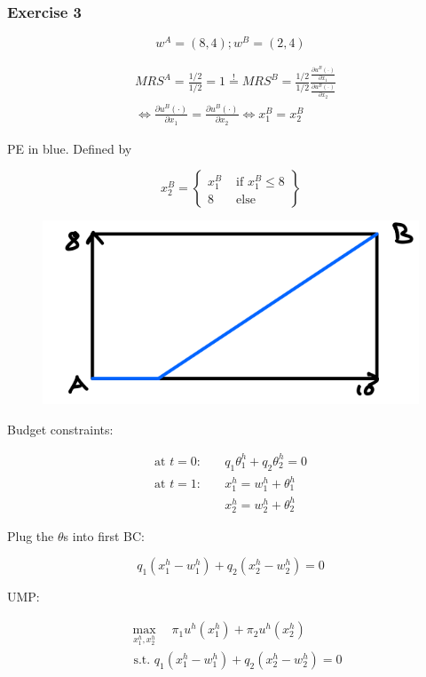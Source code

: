 {
\subsubsection*{Exercise 3} 

$$
w^{A}=(8,4) ; w^{B}=(2,4)
$$

\begin{enumerate}[label=(\alph*)]
{\item
$$
\begin{aligned}
& M R S^{A}=\frac{1 / 2}{1 / 2}=1 \stackrel{!}{=} MRS^{B}=\frac{1 / 2}{1 / 2} \frac{\frac{\partial u^{B}(\cdot)}{\partial x_{1}}}{\frac{\partial u^{B}(\cdot)}{\partial x_{2}}} \\
& \Longleftrightarrow \frac{\partial u^{B} \left(\cdot\right)}{\partial x_{1}}=\frac{\partial u^{B}(\cdot)}{\partial x_{2}} \Longleftrightarrow x_{1}^{B}=x_{2}^{B}
\end{aligned}
$$

PE in blue. Defined by

$$
x_{2}^{B}=\left\{\begin{array}{ll}
x_{1}^{B} & \text { if } x_{1}^{B} \leq 8 \\
8 & \text { else }
\end{array}\right\}
$$

\begin{figure}[!h]
    \centering
    \includegraphics[width=.5\textwidth]{images/2015_16_3.png}
\end{figure}
}
{\item 
Budget constraints:

\begin{align*}
    \text{at } t = 0: \quad & q_1 \theta_1^h+q_2 \theta_2^h=0 \\
    \text{at } t = 1: \quad & x_1^h=w_1^h+\theta_1^h \\
    & x_2^h=w_2^h+\theta_2^h
\end{align*}

Plug the $\theta$s into first BC:

$$
q_{1}\left(x_{1}^{h}-w_{1}^{h}\right)+q_{2}\left(x_{2}^{h}-w_{2}^{h}\right)=0
$$

UMP:

$$
\begin{aligned}
& \max _{x_{1}^{h}, x_{2}^{h}} \quad \pi_{1} u^{h}\left(x_{1}^{h}\right)+\pi_{2} u^{h}\left(x_{2}^{h}\right) \\
& \text { s.t. } q_{1}\left(x_{1}^{h}-w_{1}^{h}\right)+q_{2}\left(x_{2}^{h}-w_{2}^{h}\right)=0
\end{aligned}
$$

}
\end{enumerate}}
